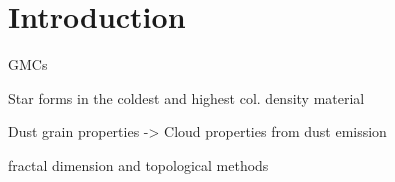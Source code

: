 \chapter{Introduction}

GMCs

Star forms in the coldest and highest col. density material

Dust grain properties -> Cloud properties from dust emission

fractal dimension and topological methods
